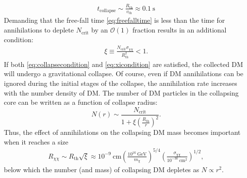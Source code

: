 \documentclass[preprintnumbers,amsmath,amssymb,prd,superscriptaddress]{revtex4}
\newcommand{\OO}{\mathcal{O}}
\newcommand{\GeV}{\text{GeV}}
\newcommand{\cm}{\text{cm}}
\def\r{\right)}
\def\l{\left(}
\begin{document}
\begin{align}
\label{eq:freefalltime}
  t_\text{collapse} \sim \frac{R_\text{th}}{v_\text{th}} \approx 0.1 ~\text{s}
\end{align}
Demanding that the free-fall time \eqref{eq:freefalltime} is less than the time for annihilations to deplete $N_\text{crit}$ by an $\OO(1)$ fraction results in an additional condition:
\begin{align}
\label{eq:xicondition}
\xi \equiv \frac{N_\text{crit} \sigma_{\chi \chi}}{R_\text{th}^2} < 1.
\end{align}
If both \eqref{eq:collapsecondition} and \eqref{eq:xicondition} are satisfied, the collected DM will undergo a gravitational collapse.
Of course, even if DM annihilations can be ignored during the initial stages of the collapse, the annihilation rate increases with the number density of DM. 
The number of DM particles in the collapsing core can be written as a function of collapse radius:
\begin{equation}
\label{eq:DMcollapsedeplete}
N(r) \sim \frac{N_\text{crit}}{1 + \xi \l \frac{R_\text{th}}{r}\r^2}. 
\end{equation}
Thus, the effect of annihilations on the collapsing DM mass becomes important when it reaches a size
\begin{align}
R_{\chi \chi} \sim R_\text{th} \sqrt{\xi} \approx 10^{-9} ~\cm  \l \frac{10^{16} ~\GeV}{m_\chi} \r^{5/4} \l \frac{\sigma_{\chi \chi}}{10^{-30} ~\cm^2} \r^{1/2}, 
\end{align}
below which the number (and mass) of collapsing DM depletes as $N \propto r^2$. 
\end{document}
